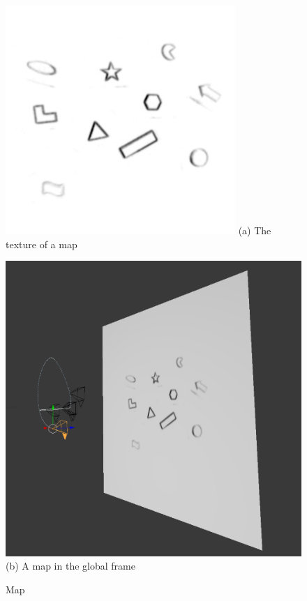 \begin{figure}
  \begin{minipage}[t]{0.48\textwidth}
    \centering \includegraphics[width =
    \textwidth]{images/map_805.jpg}
    (a) The texture of a map
  \end{minipage}
  \hfill
  \begin{minipage}[t]{0.48\textwidth}
    \centering \includegraphics[width = \textwidth]{images/4.png}
    (b) A map in the global frame
  \end{minipage}
  \caption{Map}
  \label{fig:map}
\end{figure}



